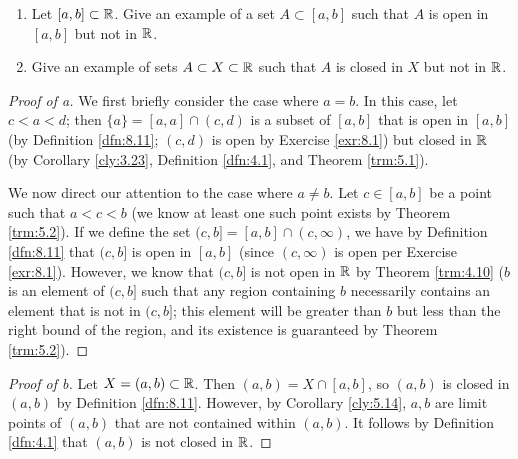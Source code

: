 \documentclass[../main.tex]{subfiles}
\begin{document}
\begin{exercise}\label{exr:8.14}\leavevmode
    \begin{enumerate}[label={\alph*)},ref={\theexercise\alph*}]
        \item \label{exr:8.14a}Let $[a,b]\subset\mathbb{R}$. Give an example of a set $A\subset[a,b]$ such that $A$ is open in $[a,b]$ but not in $\mathbb{R}$.
        \item \label{exr:8.14b}Give an example of sets $A\subset X\subset\mathbb{R}$ such that $A$ is closed in $X$ but not in $\mathbb{R}$.
    \end{enumerate}
    \begin{proof}[Proof of a]
        We first briefly consider the case where $a=b$. In this case, let $c<a<d$; then $\{a\}=[a,a]\cap(c,d)$ is a subset of $[a,b]$ that is open in $[a,b]$ (by Definition \ref{dfn:8.11}; $(c,d)$ is open by Exercise \ref{exr:8.1}) but closed in $\mathbb{R}$ (by Corollary \ref{cly:3.23}, Definition \ref{dfn:4.1}, and Theorem \ref{trm:5.1}).\par
        We now direct our attention to the case where $a\neq b$. Let $c\in[a,b]$ be a point such that $a<c<b$ (we know at least one such point exists by Theorem \ref{trm:5.2}). If we define the set $(c,b]=[a,b]\cap(c,\infty)$, we have by Definition \ref{dfn:8.11} that $(c,b]$ is open in $[a,b]$ (since $(c,\infty)$ is open per Exercise \ref{exr:8.1}). However, we know that $(c,b]$ is not open in $\mathbb{R}$ by Theorem \ref{trm:4.10} ($b$ is an element of $(c,b]$ such that any region containing $b$ necessarily contains an element that is not in $(c,b]$; this element will be greater than $b$ but less than the right bound of the region, and its existence is guaranteed by Theorem \ref{trm:5.2}).
    \end{proof}
    \begin{proof}[Proof of b]
        Let $X=(a,b)\subset\mathbb{R}$. Then $(a,b)=X\cap[a,b]$, so $(a,b)$ is closed in $(a,b)$ by Definition \ref{dfn:8.11}. However, by Corollary \ref{cly:5.14}, $a,b$ are limit points of $(a,b)$ that are not contained within $(a,b)$. It follows by Definition \ref{dfn:4.1} that $(a,b)$ is not closed in $\mathbb{R}$.
    \end{proof}
\end{exercise}
\end{document}

